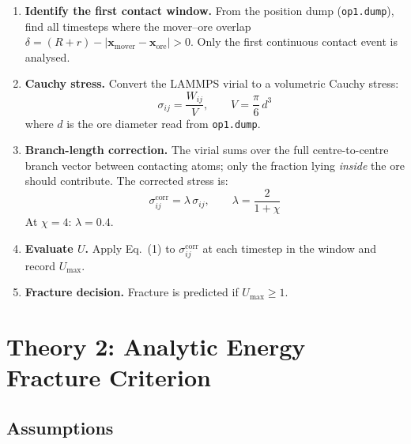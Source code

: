 \documentclass{article}
\begin{document}
\begin{enumerate}
    \item \textbf{Identify the first contact window.}
          From the position dump (\texttt{op1.dump}), find all timesteps where the
          mover–ore overlap $\delta = (R+r) - |\mathbf{x}_{\text{mover}} -
          \mathbf{x}_{\text{ore}}| > 0$.  Only the first continuous contact
          event is analysed.

    \item \textbf{Cauchy stress.}
          Convert the LAMMPS virial to a volumetric Cauchy stress:
          \begin{equation}
              \sigma_{ij} = \frac{W_{ij}}{V}, \qquad V = \frac{\pi}{6}\,d^3
          \end{equation}
          where $d$ is the ore diameter read from \texttt{op1.dump}.

    \item \textbf{Branch-length correction.}
          The virial sums over the full centre-to-centre branch vector between
          contacting atoms; only the fraction lying \emph{inside} the ore should
          contribute.  The corrected stress is:
          \begin{equation}
              \sigma_{ij}^{\text{corr}} = \lambda\,\sigma_{ij}, \qquad
              \lambda = \frac{2}{1+\chi}
          \end{equation}
          At $\chi = 4$: $\lambda = 0.4$.

    \item \textbf{Evaluate $U$.}
          Apply Eq.~(1) to $\sigma_{ij}^{\text{corr}}$ at each timestep in the
          window and record $U_{\max}$.

    \item \textbf{Fracture decision.}
          Fracture is predicted if $U_{\max} \geq 1$.
\end{enumerate}

\section{Theory 2: Analytic Energy Fracture Criterion}
\label{sec:theory2}

\subsection{Assumptions}
\end{document}
